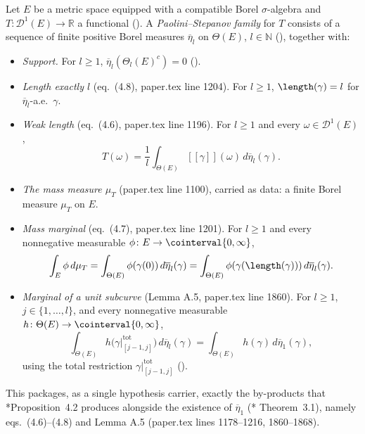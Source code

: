 \begin{definition}
  Let $E$ be a metric space equipped with a compatible Borel $\sigma$-algebra and $T \colon \mathcal{D}^1(E) \to \mathbb{R}$ a
  functional (). A \emph{Paolini--Stepanov family} for $T$ consists of a sequence of
  finite positive Borel measures $\overline{\eta}_l$ on $\Theta(E)$, $l \in \mathbb{N}$
  (), together with:
  \begin{itemize}
    \item \emph{Support.} For $l \ge 1$, $\overline{\eta}_l(\Theta_l(E)^c) = 0$
      ().
    \item \emph{Length exactly $l$} (eq.~(4.8), paper.tex line 1204). For $l \ge 1$,
      $\length(\gamma) = l$ for $\overline{\eta}_l$-a.e.\ $\gamma$.
    \item \emph{Weak length} (eq.~(4.6), paper.tex line 1196). For $l \ge 1$ and every
      $\omega \in \mathcal{D}^1(E)$,
      \[
        T(\omega) = \frac{1}{l} \int_{\Theta(E)} [[\gamma]](\omega) \, d\overline{\eta}_l(\gamma)
        .
      \]
    \item \emph{The mass measure $\mu_T$} (paper.tex line 1100), carried as data: a finite Borel
      measure $\mu_T$ on $E$.
    \item \emph{Mass marginal} (eq.~(4.7), paper.tex line 1201). For $l \ge 1$ and every
      nonnegative measurable $\phi \colon E \to \cointerval{0,\infty}$,
      \[
        \int_E \phi \, d\mu_T = \int_{\Theta(E)} \phi(\gamma(0)) \, d\overline{\eta}_l(\gamma)
        = \int_{\Theta(E)} \phi(\gamma(\length(\gamma))) \, d\overline{\eta}_l(\gamma)
        .
      \]
    \item \emph{Marginal of a unit subcurve} (Lemma A.5, paper.tex line 1860). For $l \ge 1$,
      $j \in \{1,\dotsc,l\}$, and every nonnegative measurable $h \colon \Theta(E) \to
      \cointerval{0,\infty}$,
      \[
        \int_{\Theta(E)} h\bigl(\gamma|^{\mathrm{tot}}_{[j-1,j]}\bigr) \, d\overline{\eta}_l(\gamma)
        = \int_{\Theta(E)} h(\gamma) \, d\overline{\eta}_1(\gamma)
        ,
      \]
      using the total restriction $\gamma|^{\mathrm{tot}}_{[j-1,j]}$ ().
  \end{itemize}
  This packages, as a single hypothesis carrier, exactly the by-products that
  \cite{PS}*{Proposition~4.2} produces alongside the existence of $\overline{\eta}_1$ (\cite{PS}*{
  Theorem~3.1}), namely eqs.~(4.6)--(4.8) and Lemma A.5 (paper.tex lines 1178--1216, 1860--1868).


\end{definition}
